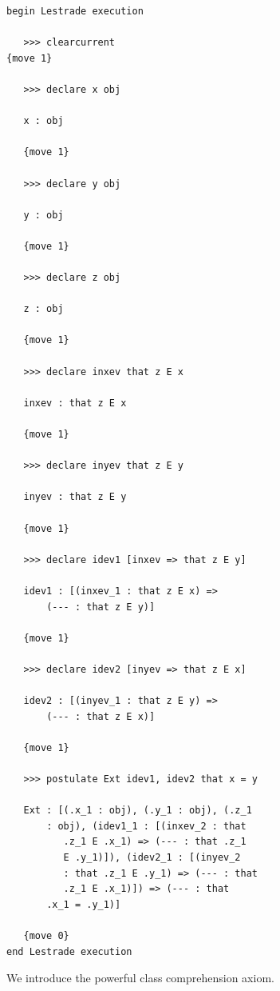 \documentclass[12pt]{article}
\begin{document}
\begin{verbatim}
begin Lestrade execution

   >>> clearcurrent
{move 1}

   >>> declare x obj

   x : obj

   {move 1}

   >>> declare y obj

   y : obj

   {move 1}

   >>> declare z obj

   z : obj

   {move 1}

   >>> declare inxev that z E x

   inxev : that z E x

   {move 1}

   >>> declare inyev that z E y

   inyev : that z E y

   {move 1}

   >>> declare idev1 [inxev => that z E y]

   idev1 : [(inxev_1 : that z E x) => 
       (--- : that z E y)]

   {move 1}

   >>> declare idev2 [inyev => that z E x]

   idev2 : [(inyev_1 : that z E y) => 
       (--- : that z E x)]

   {move 1}

   >>> postulate Ext idev1, idev2 that x = y

   Ext : [(.x_1 : obj), (.y_1 : obj), (.z_1 
       : obj), (idev1_1 : [(inxev_2 : that 
          .z_1 E .x_1) => (--- : that .z_1 
          E .y_1)]), (idev2_1 : [(inyev_2 
          : that .z_1 E .y_1) => (--- : that 
          .z_1 E .x_1)]) => (--- : that 
       .x_1 = .y_1)]

   {move 0}
end Lestrade execution
\end{verbatim}

We introduce the powerful class comprehension axiom.
\end{document}
